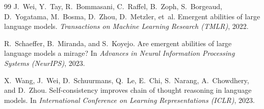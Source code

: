 \documentclass[11pt]{article}
\begin{document}
\begin{thebibliography}{99}
J.~Wei, Y.~Tay, R.~Bommasani, C.~Raffel, B.~Zoph, S.~Borgeaud, D.~Yogatama,
M.~Bosma, D.~Zhou, D.~Metzler, et~al.
\newblock Emergent abilities of large language models.
\newblock \emph{Transactions on Machine Learning Research (TMLR)}, 2022.

R.~Schaeffer, B.~Miranda, and S.~Koyejo.
\newblock Are emergent abilities of large language models a mirage?
\newblock In \emph{Advances in Neural Information Processing Systems (NeurIPS)}, 2023.

X.~Wang, J.~Wei, D.~Schuurmans, Q.~Le, E.~Chi, S.~Narang, A.~Chowdhery, and D.~Zhou.
\newblock Self-consistency improves chain of thought reasoning in language models.
\newblock In \emph{International Conference on Learning Representations (ICLR)}, 2023.

\end{thebibliography}
\end{document}
